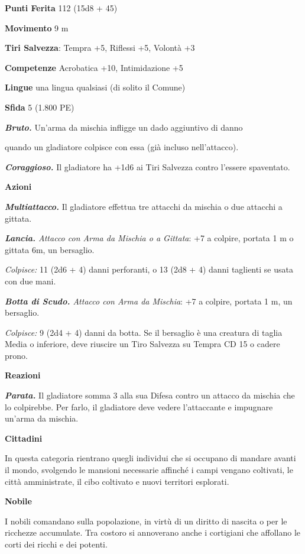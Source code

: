 \begin{multicols}{2}
\textbf{Punti Ferita} 112 (15d8 + 45)

\textbf{Movimento} 9 m

\textbf{Tiri Salvezza}: Tempra +5, Riflessi +5, Volontà +3 

\textbf{Competenze} Acrobatica +10, Intimidazione +5

\textbf{Lingue} una lingua qualsiasi (di solito il Comune)

\textbf{Sfida} 5 (1.800 PE)

\emph{\textbf{Bruto.}} Un'arma da mischia infligge un dado aggiuntivo di danno

quando un gladiatore colpisce con essa (già incluso nell'attacco).

\emph{\textbf{Coraggioso.}} Il gladiatore ha +1d6 ai Tiri Salvezza contro l'essere spaventato.

\textbf{Azioni}

\emph{\textbf{Multiattacco.}} Il gladiatore effettua tre attacchi da mischia o due attacchi a gittata.

\emph{\textbf{Lancia.} Attacco con Arma da Mischia o a Gittata}: +7 a colpire, portata 1 m o gittata 6m, un bersaglio.

\emph{Colpisce:} 11 (2d6 + 4) danni perforanti, o 13 (2d8 + 4) danni taglienti se usata con due mani.

\emph{\textbf{Botta di Scudo.} Attacco con Arma da Mischia}: +7 a colpire, portata 1 m, un bersaglio.

\emph{Colpisce:} 9 (2d4 + 4) danni da botta. Se il bersaglio è una creatura di taglia Media o inferiore, deve riuscire un Tiro Salvezza su Tempra CD 15 o cadere prono.

\textbf{Reazioni}

\emph{\textbf{Parata.}} Il gladiatore somma 3 alla sua Difesa contro un attacco da mischia che lo colpirebbe. Per farlo, il gladiatore deve vedere l'attaccante e impugnare un'arma da mischia.

\medskip\textbf{Cittadini}

In questa categoria rientrano quegli individui che si occupano di mandare avanti il mondo, svolgendo le mansioni necessarie affinché i campi vengano coltivati, le città amministrate, il cibo coltivato e
nuovi territori esplorati.

\medskip\textbf{Nobile}

I nobili comandano sulla popolazione, in virtù di un diritto di nascita o per le ricchezze accumulate. Tra costoro si annoverano anche i cortigiani che affollano le corti dei ricchi e dei potenti.


\end{multicols}
